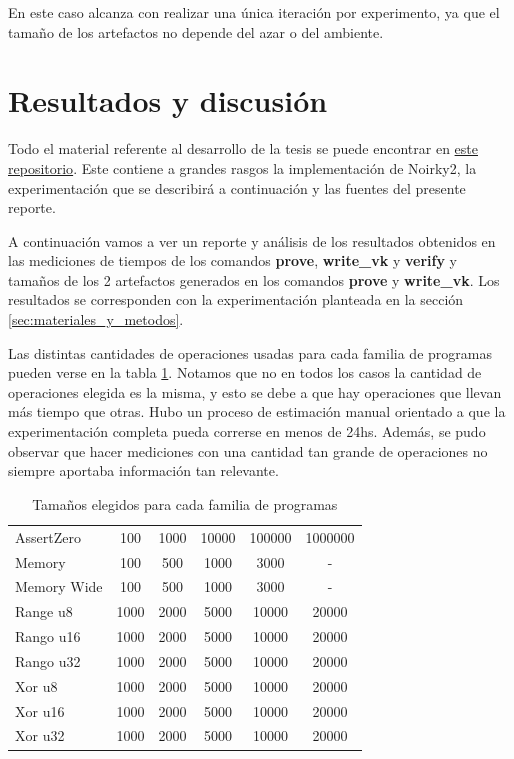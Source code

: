 \documentclass[11pt,a4paper]{tesis}
\begin{document}
En este caso alcanza con realizar una única iteración por experimento, ya que el tamaño de los artefactos no depende del azar o del ambiente. 


\part{Resultados y discusión}
Todo el material referente al desarrollo de la tesis se puede encontrar en \href{https://github.com/brweisz/Tesis-de-licenciatura-Bruno-Weisz}{este repositorio}. Este contiene a grandes rasgos la implementación de Noirky2, la experimentación que se describirá a continuación y las fuentes del presente reporte.

\vspace{0.5em}

A continuación vamos a ver un reporte y análisis de los resultados obtenidos en las mediciones de tiempos de los comandos \textbf{prove}, \textbf{write\_vk} y \textbf{verify} y tamaños de los 2 artefactos generados en los comandos \textbf{prove} y \textbf{write\_vk}. Los resultados se corresponden con la experimentación planteada en la sección \ref{sec:materiales_y_metodos}. 

Las distintas cantidades de operaciones usadas para cada familia de programas pueden verse en la tabla \ref{tab:tamanio_por_programa}. Notamos que no en todos los casos la cantidad de operaciones elegida es la misma, y esto se debe a que hay operaciones que llevan más tiempo que otras. Hubo un proceso de estimación manual orientado a que la experimentación completa pueda correrse en menos de 24hs. Además, se pudo observar que hacer mediciones con una cantidad tan grande de operaciones no siempre aportaba información tan relevante.

\begin{table}[h!]
\centering
\begin{tabular}{lccccc} 

AssertZero   & 100 & 1000 & 10000 & 100000 & 1000000 \\
Memory       & 100 & 500  & 1000  & 3000  & - \\
Memory Wide  & 100 & 500  & 1000  & 3000  & - \\
Range u8     & 1000 & 2000 & 5000 & 10000 & 20000 \\
Rango u16    & 1000 & 2000 & 5000 & 10000 & 20000 \\
Rango u32    & 1000 & 2000 & 5000 & 10000 & 20000 \\
Xor u8       & 1000 & 2000 & 5000 & 10000 & 20000 \\
Xor u16      & 1000 & 2000 & 5000 & 10000 & 20000 \\
Xor u32      & 1000 & 2000 & 5000 & 10000 & 20000 \\
\hline
\end{tabular}
\caption{Tamaños elegidos para cada familia de programas}
\label{tab:tamanio_por_programa}
\end{table}
\end{document}
